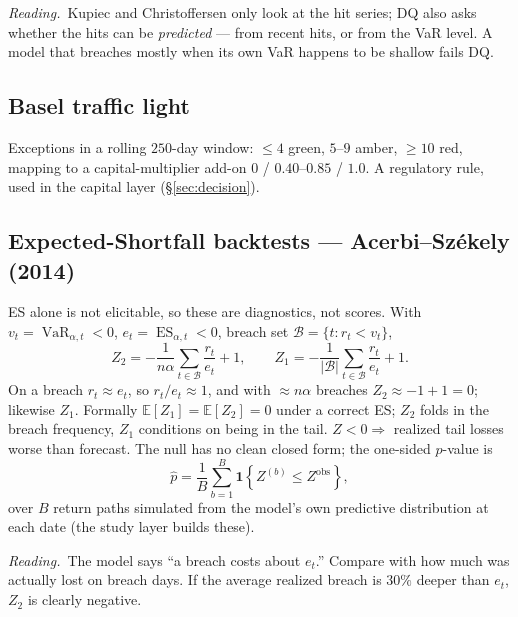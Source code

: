 \documentclass[11pt,a4paper]{article}
\newcommand{\E}{\mathbb{E}}
\newcommand{\Ind}[1]{\mathbf{1}\!\left\{#1\right\}}
\newcommand{\VaR}{\operatorname{VaR}}
\newcommand{\ES}{\operatorname{ES}}
\newcommand{\intuition}[1]{\par\smallskip\noindent\textit{Reading.}\ #1\par\smallskip}
\begin{document}
\intuition{Kupiec and Christoffersen only look at the hit series; DQ also asks
whether the hits can be \emph{predicted} --- from recent hits, or from the VaR
level. A model that breaches mostly when its own VaR happens to be shallow fails
DQ.}

\subsection{Basel traffic light}

Exceptions in a rolling $250$-day window: $\le 4$ green, $5$--$9$ amber, $\ge 10$
red, mapping to a capital-multiplier add-on $0$ / $0.40$--$0.85$ / $1.0$. A
regulatory rule, used in the capital layer (\S\ref{sec:decision}).

\subsection{Expected-Shortfall backtests --- Acerbi--Székely (2014)}

ES alone is not elicitable, so these are diagnostics, not scores. With
$v_t=\VaR_{\alpha,t}<0$, $e_t=\ES_{\alpha,t}<0$, breach set
$\mathcal B=\{t:r_t<v_t\}$,
\begin{equation}
  Z_2 = -\frac{1}{n\alpha}\sum_{t\in\mathcal B}\frac{r_t}{e_t} + 1,
  \qquad
  Z_1 = -\frac{1}{|\mathcal B|}\sum_{t\in\mathcal B}\frac{r_t}{e_t} + 1 .
\end{equation}
On a breach $r_t\approx e_t$, so $r_t/e_t\approx1$, and with $\approx n\alpha$
breaches $Z_2\approx-1+1=0$; likewise $Z_1$. Formally $\E[Z_1]=\E[Z_2]=0$ under
a correct ES; $Z_2$ folds in the breach frequency, $Z_1$ conditions on being in
the tail. $Z<0\Rightarrow$ realized tail losses worse than forecast. The null
has no clean closed form; the one-sided $p$-value is
\begin{equation}
  \widehat p = \frac{1}{B}\sum_{b=1}^{B}\Ind{Z^{(b)}\le Z^{\text{obs}}},
\end{equation}
over $B$ return paths simulated from the model's own predictive distribution at
each date (the study layer builds these).

\intuition{The model says ``a breach costs about $e_t$.'' Compare with how much
was actually lost on breach days. If the average realized breach is $30\%$
deeper than $e_t$, $Z_2$ is clearly negative.}

\end{document}
